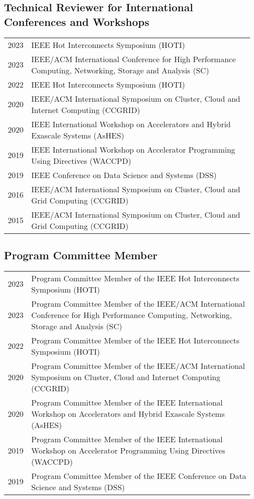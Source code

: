 \documentclass[a4paper,10pt]{article}
\begin{document}
\subsection*{Technical Reviewer for International Conferences and Workshops}
\begin{tabular}{rp{11cm}}
    2023 & IEEE Hot Interconnects Symposium (HOTI) \\
    2023 & IEEE/ACM International Conference for High Performance Computing,
    Networking, Storage and Analysis (SC) \\
    2022 & IEEE Hot Interconnects Symposium (HOTI) \\
    2020 & IEEE/ACM International Symposium on Cluster, Cloud and Internet Computing (CCGRID)\\
    2020 & IEEE International Workshop on Accelerators and Hybrid Exascale Systems (AsHES)\\
    2019 & IEEE International Workshop on Accelerator Programming Using Directives (WACCPD)\\
    2019 & IEEE Conference on Data Science and Systems (DSS)\\
    2016 & IEEE/ACM International Symposium on Cluster, Cloud and Grid Computing (CCGRID)\\
    2015 & IEEE/ACM International Symposium on Cluster, Cloud and Grid Computing (CCGRID)\\
\end{tabular}

\subsection*{Program Committee Member}
\begin{tabular}{rp{11cm}}
    2023 & Program Committee Member of the IEEE Hot Interconnects Symposium (HOTI) \\
    2023 & Program Committee Member of the IEEE/ACM International Conference for High Performance Computing,
    Networking, Storage and Analysis (SC) \\
    2022 & Program Committee Member of the IEEE Hot Interconnects Symposium (HOTI) \\
    2020 & Program Committee Member of the IEEE/ACM International Symposium on Cluster, Cloud and Internet Computing (CCGRID)\\
    2020 & Program Committee Member of the IEEE International Workshop on Accelerators and Hybrid Exascale Systems (AsHES)\\
    2019 & Program Committee Member of the IEEE International Workshop on Accelerator Programming Using Directives (WACCPD)\\
    2019 & Program Committee Member of the IEEE Conference on Data Science and Systems (DSS)\\
\end{tabular}
\end{document}
